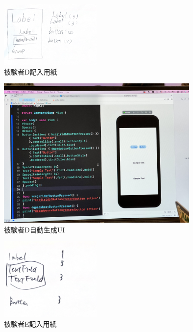 \begin{figure}[htbp]
  \begin{minipage}{\hsize}
    \begin{center}
       \includegraphics[width=50mm]{img/usertest_viewstructure_4.png}
    \end{center}
    \caption{被験者D記入用紙}
    \label{fig:usertest_viewstructure_4}
  \end{minipage}
\end{figure}

\begin{figure}[htbp]
  \begin{minipage}{\hsize}
    \begin{center}
       \includegraphics[width=100mm]{img/usertest_autogen_4.jpeg}
    \end{center}
    \caption{被験者D自動生成UI}
    \label{fig:usertest_autogen_4}
  \end{minipage}
\end{figure}


\begin{figure}[htbp]
  \begin{minipage}{\hsize}
    \begin{center}
       \includegraphics[width=50mm]{img/usertest_viewstructure_5.png}
    \end{center}
    \caption{被験者E記入用紙}
    \label{fig:usertest_viewstructure_5}
  \end{minipage}
\end{figure}

